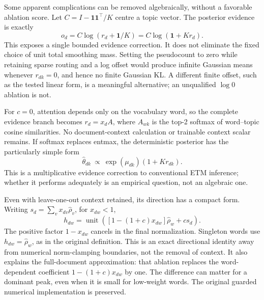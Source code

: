 \documentclass[10pt,a4paper]{article}
\begin{document}
Some apparent complications can be removed algebraically, without a favorable
ablation score. Let $C=I-\mathbf{1}\mathbf{1}^{\top}/K$ centre a topic vector.
The posterior evidence is exactly
\begin{equation}
 o_d=C\log(r_d+\mathbf{1}/K)=C\log(\mathbf{1}+Kr_d).
 \label{eq:log1p-reduction}
\end{equation}
This exposes a single bounded evidence correction. It does not eliminate the
fixed choice of unit total smoothing mass. Setting the pseudocount to zero
while retaining sparse routing and a log offset would produce infinite
Gaussian means whenever $r_{dk}=0$, and hence no finite Gaussian KL. A different
finite offset, such as the tested linear form, is a meaningful alternative;
an unqualified $\log 0$ ablation is not.

For $c=0$, attention depends only on the vocabulary word, so the complete
evidence branch becomes $r_d=x_d A$, where $A_{wk}$ is the top-2 softmax of
word--topic cosine similarities. No document-context calculation or trainable
context scalar remains. If softmax replaces entmax, the deterministic posterior
has the particularly simple form
\begin{equation}
 \widehat\theta_{dk}\ \propto\
 \exp(\mu_{dk})(1+Kr_{dk}).
\end{equation}
This is a multiplicative evidence correction to conventional ETM inference;
whether it performs adequately is an empirical question, not an algebraic one.

Even with leave-one-out context retained, its direction has a compact form.
Writing $s_d=\sum_v x_{dv}\widehat\rho_v$, for $x_{dw}<1$,
\begin{equation}
 h_{dw}=\operatorname{unit}\!\left(
 [1-(1+c)x_{dw}]\widehat\rho_w+c s_d\right).
\end{equation}
The positive factor $1-x_{dw}$ cancels in the final normalization. Singleton
words use $h_{dw}=\widehat\rho_w$, as in the original definition. This is an
exact directional identity away from numerical norm-clamping boundaries, not
the removal of context. It also explains the full-document approximation:
that ablation replaces the word-dependent coefficient $1-(1+c)x_{dw}$ by one.
The difference can matter for a dominant peak, even when it is small for
low-weight words. The original guarded numerical implementation is preserved.
\end{document}

